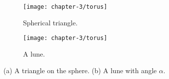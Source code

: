  \begin{figure}[htb]
         \centering
        \begin{subfigure}[b]{0.35\textwidth}
         \texttt{[image: chapter-3/torus]}
         \caption{Spherical triangle.}
 	 \label{fig:sphere-triangle}
       \end{subfigure}
         \hspace{1cm}
         \begin{subfigure}[b]{0.35\textwidth}
         \texttt{[image: chapter-3/torus]}
         \caption{A lune.}
          \label{fig:lune}
         \end{subfigure}
		\caption{(a) A triangle on the sphere.
 		(b) A lune with angle $\alpha$.
 		\label{fig:torus}}
 \end{figure}








